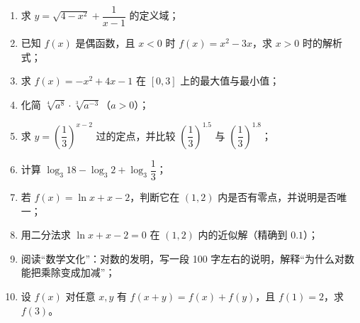 \begin{afterclass}
\begin{enumerate}
  \item 求 $y=\sqrt{4-x^2}+\dfrac{1}{x-1}$ 的定义域；
  \item 已知 $f(x)$ 是偶函数，且 $x<0$ 时 $f(x)=x^2-3x$，求 $x>0$ 时的解析式；
  \item 求 $f(x)=-x^2+4x-1$ 在 $[0,3]$ 上的最大值与最小值；
  \item 化简 $\sqrt[4]{a^8}\cdot\sqrt[3]{a^{-3}}$（$a>0$）；
  \item 求 $y=\left(\dfrac13\right)^{x-2}$ 过的定点，并比较 $\left(\dfrac13\right)^{1.5}$ 与 $\left(\dfrac13\right)^{1.8}$；
  \item 计算 $\log_3 18-\log_3 2+\log_3\dfrac{1}{3}$；
  \item 若 $f(x)=\ln x+x-2$，判断它在 $(1,2)$ 内是否有零点，并说明是否唯一；
  \item 用二分法求 $\ln x+x-2=0$ 在 $(1,2)$ 内的近似解（精确到 $0.1$）；
  \item 阅读“数学文化”：对数的发明，写一段 100 字左右的说明，解释“为什么对数能把乘除变成加减”；
  \item 设 $f(x)$ 对任意 $x,y$ 有 $f(x+y)=f(x)+f(y)$，且 $f(1)=2$，求 $f(3)$。
\end{enumerate}
\end{afterclass}

